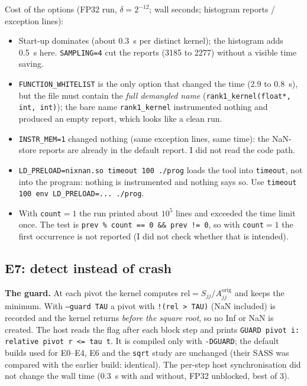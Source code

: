 \documentclass[11pt,a4paper]{article}
\begin{document}
Cost of the options (FP32 run, $\delta=2^{-12}$; wall seconds; histogram reports / exception lines):

\begin{center}\scriptsize\end{center}

\begin{itemize}
  \item Start-up dominates (about 0.3~s per distinct kernel); the histogram adds 0.5~s here. \texttt{SAMPLING=4} cut the reports (3185 to 2277) without a visible time saving.
  \item \texttt{FUNCTION\_WHITELIST} is the only option that changed the time (2.9 to 0.8~s), but the file must contain the \emph{full demangled name} (\texttt{rank1\_kernel(float*, int, int)}); the bare name \texttt{rank1\_kernel} instrumented nothing and produced an empty report, which looks like a clean run.
  \item \texttt{INSTR\_MEM=1} changed nothing (same exception lines, same time): the NaN-store reports are already in the default report. I did not read the code path.
  \item \texttt{LD\_PRELOAD=nixnan.so timeout 100 ./prog} loads the tool into \texttt{timeout}, not into the program: nothing is instrumented and nothing says so. Use \texttt{timeout 100 env LD\_PRELOAD=... ./prog}.
  \item With \texttt{count}$=1$ the run printed about $10^{5}$ lines and exceeded the time limit once. The test is \texttt{prev \% count == 0 \&\& prev != 0}, so with \texttt{count}$=1$ the first occurrence is not reported (I did not check whether that is intended).
\end{itemize}

\subsection{E7: detect instead of crash}\label{sec:e7}

\textbf{The guard.} At each pivot the kernel computes $\mathrm{rel}=S_{jj}/A_{jj}^{\mathrm{orig}}$ and keeps the minimum. With \texttt{--guard TAU} a pivot with \texttt{!(rel > TAU)} (NaN included) is recorded and the kernel returns \emph{before the square root}, so no Inf or NaN is created. The host reads the flag after each block step and prints
\texttt{GUARD pivot i: relative pivot r <= tau t}. It is compiled only with \texttt{-DGUARD}; the default builds used for E0--E4, E6 and the \texttt{sqrt} study are unchanged (their SASS was compared with the earlier build: identical). The per-step host synchronisation did not change the wall time (0.3~s with and without, FP32 unblocked, best of 3).
\end{document}
